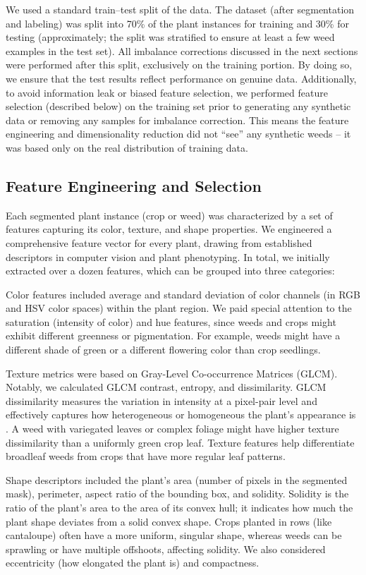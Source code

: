 \documentclass[agriengineering,article,submit,pdftex,moreauthors]{Definitions/mdpi}
\begin{document}
We used a standard train–test split of the data. The dataset (after segmentation and labeling) was split into 70\% of the plant instances for training and 30\% for testing (approximately; the split was stratified to ensure at least a few weed examples in the test set). All imbalance corrections discussed in the next sections were performed after this split, exclusively on the training portion. By doing so, we ensure that the test results reflect performance on genuine data. Additionally, to avoid information leak or biased feature selection, we performed feature selection (described below) on the training set prior to generating any synthetic data or removing any samples for imbalance correction. This means the feature engineering and dimensionality reduction did not “see” any synthetic weeds – it was based only on the real distribution of training data.
%
\subsection{Feature Engineering and Selection}
Each segmented plant instance (crop or weed) was characterized by a set of features capturing its color, texture, and shape properties. We engineered a comprehensive feature vector for every plant, drawing from established descriptors in computer vision and plant phenotyping. In total, we initially extracted over a dozen features, which can be grouped into three categories:

Color features included average and standard deviation of color channels (in RGB and HSV color spaces) within the plant region. We paid special attention to the saturation (intensity of color) and hue features, since weeds and crops might exhibit different greenness or pigmentation. For example, weeds might have a different shade of green or a different flowering color than crop seedlings.

Texture metrics were based on Gray-Level Co-occurrence Matrices (GLCM). Notably, we calculated GLCM contrast, entropy, and dissimilarity. GLCM dissimilarity measures the variation in intensity at a pixel-pair level and effectively captures how heterogeneous or homogeneous the plant’s appearance is \cite{Sarkar2023-gy}. A weed with variegated leaves or complex foliage might have higher texture dissimilarity than a uniformly green crop leaf. Texture features help differentiate broadleaf weeds from crops that have more regular leaf patterns.

Shape descriptors included the plant’s area (number of pixels in the segmented mask), perimeter, aspect ratio of the bounding box, and solidity. Solidity is the ratio of the plant’s area to the area of its convex hull; it indicates how much the plant shape deviates from a solid convex shape. Crops planted in rows (like cantaloupe) often have a more uniform, singular shape, whereas weeds can be sprawling or have multiple offshoots, affecting solidity. We also considered eccentricity (how elongated the plant is) and compactness.
\end{document}
